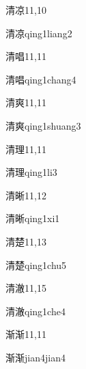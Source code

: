 \begin{entry}{清凉}{11,10}
  \begin{phonetics}{清凉}{qing1liang2}
  \end{phonetics}
\end{entry}

\begin{entry}{清唱}{11,11}
  \begin{phonetics}{清唱}{qing1chang4}
  \end{phonetics}
\end{entry}

\begin{entry}{清爽}{11,11}
  \begin{phonetics}{清爽}{qing1shuang3}
  \end{phonetics}
\end{entry}

\begin{entry}{清理}{11,11}
  \begin{phonetics}{清理}{qing1li3}
  \end{phonetics}
\end{entry}

\begin{entry}{清晰}{11,12}
  \begin{phonetics}{清晰}{qing1xi1}
  \end{phonetics}
\end{entry}

\begin{entry}{清楚}{11,13}
  \begin{phonetics}{清楚}{qing1chu5}
  \end{phonetics}
\end{entry}

\begin{entry}{清澈}{11,15}
  \begin{phonetics}{清澈}{qing1che4}
  \end{phonetics}
\end{entry}

\begin{entry}{渐渐}{11,11}
  \begin{phonetics}{渐渐}{jian4jian4}
  \end{phonetics}
\end{entry}

